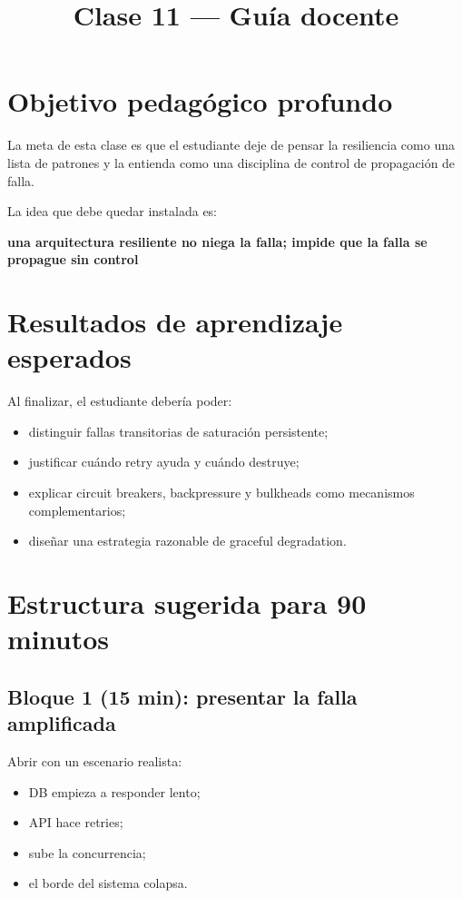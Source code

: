 \documentclass[variant=docente,cover=institutional,mode=screen]{ua-engineering-v6-article}
\title{Clase 11 --- Guía docente}
\author{\UAProfessor}
\date{\UADate}
\begin{document}
\maketitle

\section{Objetivo pedagógico profundo}

La meta de esta clase es que el estudiante deje de pensar la resiliencia como una lista de patrones y la entienda como una disciplina de control de propagación de falla.

La idea que debe quedar instalada es:

\begin{center}
\textbf{una arquitectura resiliente no niega la falla; impide que la falla se propague sin control}
\end{center}

\section{Resultados de aprendizaje esperados}

Al finalizar, el estudiante debería poder:

\begin{itemize}
\item distinguir fallas transitorias de saturación persistente;
\item justificar cuándo retry ayuda y cuándo destruye;
\item explicar circuit breakers, backpressure y bulkheads como mecanismos complementarios;
\item diseñar una estrategia razonable de graceful degradation.
\end{itemize}

\section{Estructura sugerida para 90 minutos}

\subsection*{Bloque 1 (15 min): presentar la falla amplificada}
Abrir con un escenario realista:
\begin{itemize}
\item DB empieza a responder lento;
\item API hace retries;
\item sube la concurrencia;
\item el borde del sistema colapsa.
\end{itemize}
\end{document}
